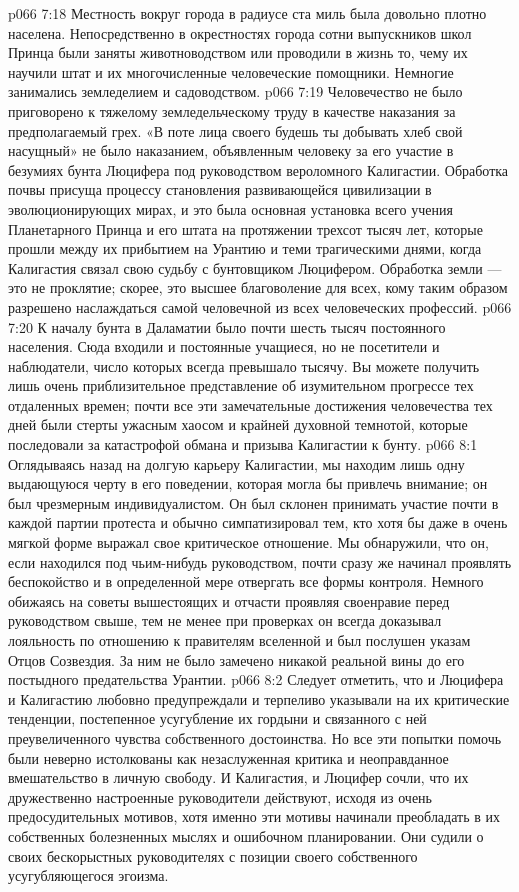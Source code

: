 \vs p066 7:18 \pc Местность вокруг города в радиусе ста миль была довольно плотно населена. Непосредственно в окрестностях города сотни выпускников школ Принца были заняты животноводством или проводили в жизнь то, чему их научили штат и их многочисленные человеческие помощники. Немногие занимались земледелием и садоводством.
\vs p066 7:19 Человечество не было приговорено к тяжелому земледельческому труду в качестве наказания за предполагаемый грех. «В поте лица своего будешь ты добывать хлеб свой насущный» не было наказанием, объявленным человеку за его участие в безумиях бунта Люцифера под руководством вероломного Калигастии. Обработка почвы присуща процессу становления развивающейся цивилизации в эволюционирующих мирах, и это была основная установка всего учения Планетарного Принца и его штата на протяжении трехсот тысяч лет, которые прошли между их прибытием на Урантию и теми трагическими днями, когда Калигастия связал свою судьбу с бунтовщиком Люцифером. Обработка земли --- это не проклятие; скорее, это высшее благоволение для всех, кому таким образом разрешено наслаждаться самой человечной из всех человеческих профессий.
\vs p066 7:20 К началу бунта в Даламатии было почти шесть тысяч постоянного населения. Сюда входили и постоянные учащиеся, но не посетители и наблюдатели, число которых всегда превышало тысячу. Вы можете получить лишь очень приблизительное представление об изумительном прогрессе тех отдаленных времен; почти все эти замечательные достижения человечества тех дней были стерты ужасным хаосом и крайней духовной темнотой, которые последовали за катастрофой обмана и призыва Калигастии к бунту.
\vs p066 8:1 Оглядываясь назад на долгую карьеру Калигастии, мы находим лишь одну выдающуюся черту в его поведении, которая могла бы привлечь внимание; он был чрезмерным индивидуалистом. Он был склонен принимать участие почти в каждой партии протеста и обычно симпатизировал тем, кто хотя бы даже в очень мягкой форме выражал свое критическое отношение. Мы обнаружили, что он, если находился под чьим\hyp{}нибудь руководством, почти сразу же начинал проявлять беспокойство и в определенной мере отвергать все формы контроля. Немного обижаясь на советы вышестоящих и отчасти проявляя своенравие перед руководством свыше, тем не менее при проверках он всегда доказывал лояльность по отношению к правителям вселенной и был послушен указам Отцов Созвездия. За ним не было замечено никакой реальной вины до его постыдного предательства Урантии.
\vs p066 8:2 Следует отметить, что и Люцифера и Калигастию любовно предупреждали и терпеливо указывали на их критические тенденции, постепенное усугубление их гордыни и связанного с ней преувеличенного чувства собственного достоинства. Но все эти попытки помочь были неверно истолкованы как незаслуженная критика и неоправданное вмешательство в личную свободу. И Калигастия, и Люцифер сочли, что их дружественно настроенные руководители действуют, исходя из очень предосудительных мотивов, хотя именно эти мотивы начинали преобладать в их собственных болезненных мыслях и ошибочном планировании. Они судили о своих бескорыстных руководителях с позиции своего собственного усугубляющегося эгоизма.
